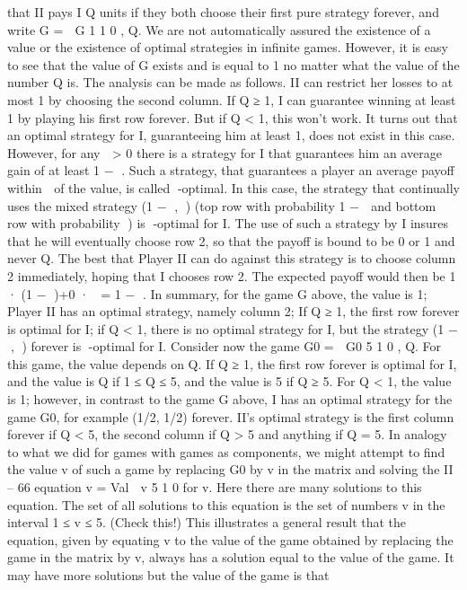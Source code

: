 that II pays I Q units if they both choose their first pure strategy forever, and write
G =
 G 1
1 0
, Q.
We are not automatically assured the existence of a value or the existence of optimal
strategies in infinite games. However, it is easy to see that the value of G exists and is
equal to 1 no matter what the value of the number Q is. The analysis can be made as
follows.
II can restrict her losses to at most 1 by choosing the second column. If Q ≥ 1, I can
guarantee winning at least 1 by playing his first row forever. But if Q < 1, this won’t work.
It turns out that an optimal strategy for I, guaranteeing him at least 1, does not exist in
this case. However, for any  > 0 there is a strategy for I that guarantees him an average
gain of at least 1 − . Such a strategy, that guarantees a player an average payoff within
 of the value, is called -optimal. In this case, the strategy that continually uses the
mixed strategy (1 − , ) (top row with probability 1 −  and bottom row with probability
) is -optimal for I. The use of such a strategy by I insures that he will eventually choose
row 2, so that the payoff is bound to be 0 or 1 and never Q. The best that Player II can
do against this strategy is to choose column 2 immediately, hoping that I chooses row 2.
The expected payoff would then be 1 · (1 − )+0 ·  = 1 − .
In summary, for the game G above, the value is 1; Player II has an optimal strategy,
namely column 2; If Q ≥ 1, the first row forever is optimal for I; if Q < 1, there is no
optimal strategy for I, but the strategy (1 − , ) forever is -optimal for I.
Consider now the game
G0 =
 G0 5
1 0
, Q.
For this game, the value depends on Q. If Q ≥ 1, the first row forever is optimal for I,
and the value is Q if 1 ≤ Q ≤ 5, and the value is 5 if Q ≥ 5. For Q < 1, the value is 1;
however, in contrast to the game G above, I has an optimal strategy for the game G0, for
example (1/2, 1/2) forever. II’s optimal strategy is the first column forever if Q < 5, the
second column if Q > 5 and anything if Q = 5.
In analogy to what we did for games with games as components, we might attempt
to find the value v of such a game by replacing G0 by v in the matrix and solving the
II – 66
equation
v = Val  v 5
1 0
for v. Here there are many solutions to this equation. The set of all solutions to this
equation is the set of numbers v in the interval 1 ≤ v ≤ 5. (Check this!)
This illustrates a general result that the equation, given by equating v to the value of
the game obtained by replacing the game in the matrix by v, always has a solution equal
to the value of the game. It may have more solutions but the value of the game is that
